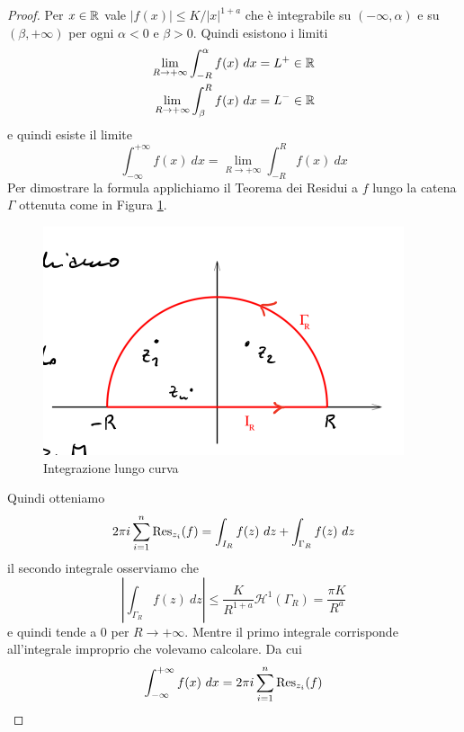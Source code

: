 \begin{proof}
   Per $x \in \mathbb{R}$ vale $|f(x)| \le K/|x|^{1+a}$ che è integrabile su $(-\infty,
  \alpha)$ e su $(\beta, +\infty)$ per ogni $\alpha < 0$ e $\beta > 0$. Quindi
  esistono i limiti 
  \begin{align*}
    \lim_{R\to +\infty} \int_{-R}^{\alpha}f(x)\ dx &= L^+ \in \mathbb{R} \\
    \lim_{R \to +\infty} \int_{\beta}^{R} f(x)\ dx &= L^- \in \mathbb{R} 
  \end{align*}
  e quindi esiste il limite
  \begin{equation*}
    \int_{-\infty}^{+\infty}f(x)\ dx = \lim_{R\to+\infty} \int_{-R}^R f(x) \ dx
  \end{equation*}
  Per dimostrare la formula applichiamo il Teorema dei Residui a $f$ lungo la
  catena $\Gamma$ ottenuta come in Figura \ref{fig:residui_1}. 
  \begin{figure}[h]
    \centering
    \includegraphics[width=0.5\linewidth]{images/analisi_complessa/residui_figura_1.png}
    \caption{Integrazione lungo curva}
    \label{fig:residui_1}
  \end{figure}
  Quindi otteniamo 
  \begin{equation*}
    2 \pi i \sum_{i=1}^{n} \operatorname{Res}_{z_i}(f) = \int_{I_R} f(z)\ dz + \int_{\Gamma_R}
    f(z)\ dz
  \end{equation*}
  il secondo integrale osserviamo che 
  \begin{equation*}
    \left|\int_{\Gamma_R} f(z)\ dz \right| \le
    \frac{K}{R^{1+a}}\mathcal{H}^{1}(\Gamma_R) = \frac{\pi K}{R^{a}}
  \end{equation*}
  e quindi tende a $0$ per $R \to +\infty$. Mentre il primo integrale
  corrisponde all'integrale improprio che volevamo calcolare. Da cui
  \begin{equation*}
     \int_{-\infty}^{+\infty} f(x)\ dx = 2\pi i \sum_{i=1}^{n} \operatorname{Res}_{z_i}(f)
  \end{equation*}  
\end{proof}

